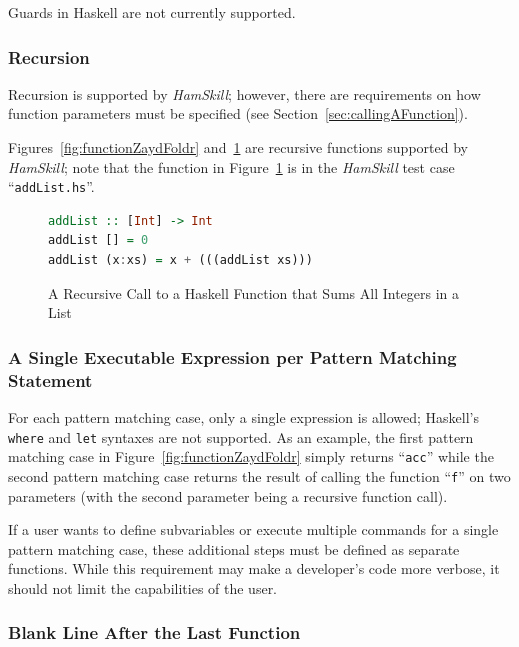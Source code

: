 \documentclass{report}
\begin{document}
Guards in Haskell are not currently supported.


\subsubsection{Recursion}

Recursion is supported by \textit{HamSkill}; however, there are requirements on how function parameters must be specified (see Section~\ref{sec:callingAFunction}).

Figures~\ref{fig:functionZaydFoldr} and~\ref{fig:functionAddList} are recursive functions supported by \textit{HamSkill}; note that the function in Figure~\ref{fig:functionAddList} is in the \textit{HamSkill} test case ``\texttt{addList.hs}''.

\begin{figure}[H]
\begin{mdframed}
\begin{lstlisting}[language=Haskell]
addList :: [Int] -> Int
addList [] = 0
addList (x:xs) = x + (((addList xs)))
\end{lstlisting}
\end{mdframed}
\caption{A Recursive Call to a Haskell Function that Sums All Integers in a List}\label{fig:functionAddList}
\end{figure}

\subsubsection{A Single Executable Expression per Pattern Matching Statement}

For each pattern matching case, only a single expression is allowed; Haskell's \texttt{where} and \texttt{let} syntaxes are not supported.  As an example, the first pattern matching case in Figure~\ref{fig:functionZaydFoldr} simply returns ``\texttt{acc}'' while the second pattern matching case returns the result of calling the function ``\texttt{f}'' on two parameters (with the second parameter being a recursive function call).

If a user wants to define subvariables or execute multiple commands for a single pattern matching case, these additional steps must be defined as separate functions.  While this requirement may make a developer's code more verbose, it should not limit the capabilities of the user.

\subsubsection{Blank Line After the Last Function}
\end{document}
